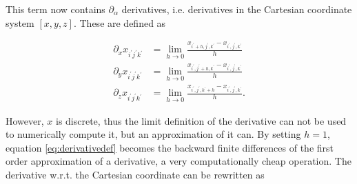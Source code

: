 This term now contains $\partial_\alpha$ derivatives, i.e. derivatives in the Cartesian coordinate system $[x,y,z]$. These are defined as

\begin{align}
\partial_x x_{i^\prime j^\prime k^\prime} &= \lim\limits_{h\to 0} \frac{x_{i^\prime+h,j^\prime,k^\prime}-x_{i^\prime, j^\prime, k^\prime}}{h} \nonumber \\
\partial_y x_{i^\prime j^\prime k^\prime} &= \lim\limits_{h\to 0} \frac{x_{i^\prime,j^\prime+h,k^\prime}-x_{i^\prime, j^\prime, k^\prime}}{h} \nonumber \\
\partial_z x_{i^\prime j^\prime k^\prime} &= \lim\limits_{h\to 0} \frac{x_{i^\prime,j^\prime,k^\prime+h}-x_{i^\prime, j^\prime, k^\prime}}{h}.\label{eq:derivativedef}
\end{align}

However, $x$ is discrete, thus the limit definition of the derivative can not be used to numerically compute it, but an approximation of it can. By setting $h=1$, equation \ref{eq:derivativedef} becomes the backward finite differences of the first order approximation of a derivative, a very computationally cheap operation. The derivative w.r.t. the Cartesian coordinate can be rewritten as

